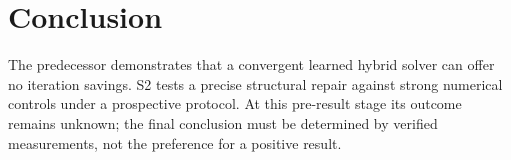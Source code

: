 \section{Conclusion}
The predecessor demonstrates that a convergent learned hybrid solver can offer no iteration savings. S2 tests a precise structural repair against strong numerical controls under a prospective protocol. At this pre-result stage its outcome remains unknown; the final conclusion must be determined by verified measurements, not the preference for a positive result.
